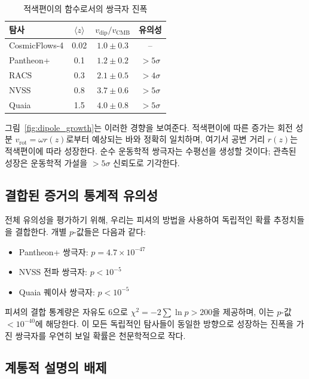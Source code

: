 \documentclass[11pt,a4paper]{article}
\begin{document}
	\begin{table}[htbp]
		\centering
		\caption{적색편이의 함수로서의 쌍극자 진폭}
		\label{tab:dipole_amplitudes}
		\begin{tabular}{lccc}
			\toprule
			\textbf{탐사} & \(\langle z \rangle\) & \(v_{\text{dip}}/v_{\text{CMB}}\) & \textbf{유의성} \\
			\midrule
			CosmicFlows-4 & 0.02 & \(1.0 \pm 0.3\) & -- \\
			Pantheon+ & 0.1 & \(1.2 \pm 0.2\) & \(>5\sigma\) \cite{Sah2025} \\
			RACS & 0.3 & \(2.1 \pm 0.5\) & \(>4\sigma\) \cite{Oayda2024} \\
			NVSS & 0.8 & \(3.7 \pm 0.6\) & \(>5\sigma\) \cite{Singal2024} \\
			Quaia & 1.5 & \(4.0 \pm 0.8\) & \(>5\sigma\) \cite{Secrest2025} \\
			\bottomrule
		\end{tabular}
	\end{table}
	
	그림~\ref{fig:dipole_growth}는 이러한 경향을 보여준다. 적색편이에 따른 증가는 회전 성분 \(v_{\mathrm{rot}} = \omega r(z)\)로부터 예상되는 바와 정확히 일치하며, 여기서 공변 거리 \(r(z)\)는 적색편이에 따라 성장한다. 순수 운동학적 쌍극자는 수평선을 생성할 것이다; 관측된 성장은 운동학적 가설을 \(>5\sigma\) 신뢰도로 기각한다.
	
	\subsection{결합된 증거의 통계적 유의성}
	
	전체 유의성을 평가하기 위해, 우리는 피셔의 방법을 사용하여 독립적인 확률 추정치들을 결합한다. 개별 \(p\)-값들은 다음과 같다:
	\begin{itemize}
		\item Pantheon+ 쌍극자: \(p = 4.7\times10^{-47}\) \cite{Sah2025}
		\item NVSS 전파 쌍극자: \(p < 10^{-5}\) \cite{Singal2024}
		\item Quaia 퀘이사 쌍극자: \(p < 10^{-5}\) \cite{Secrest2025}
	\end{itemize}
	피셔의 결합 통계량은 자유도 6으로 \(\chi^2 = -2\sum \ln p > 200\)을 제공하며, 이는 \(p\)-값 \(< 10^{-40}\)에 해당한다. 이 모든 독립적인 탐사들이 동일한 방향으로 성장하는 진폭을 가진 쌍극자를 우연히 보일 확률은 천문학적으로 작다.
	
	\subsection{계통적 설명의 배제}
	
\end{document}
